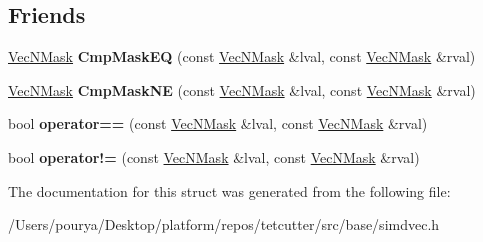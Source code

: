 \subsection*{Friends}
\begin{DoxyCompactItemize}
\item 
\hypertarget{structps_1_1simd_1_1VecNMask_a3b99811b675a188a3952056ffcecbfd8}{}\hyperlink{structps_1_1simd_1_1VecNMask}{Vec\+N\+Mask} {\bfseries Cmp\+Mask\+E\+Q} (const \hyperlink{structps_1_1simd_1_1VecNMask}{Vec\+N\+Mask} \&lval, const \hyperlink{structps_1_1simd_1_1VecNMask}{Vec\+N\+Mask} \&rval)\label{structps_1_1simd_1_1VecNMask_a3b99811b675a188a3952056ffcecbfd8}

\item 
\hypertarget{structps_1_1simd_1_1VecNMask_adc015c117f258c1e67929fe050eac18e}{}\hyperlink{structps_1_1simd_1_1VecNMask}{Vec\+N\+Mask} {\bfseries Cmp\+Mask\+N\+E} (const \hyperlink{structps_1_1simd_1_1VecNMask}{Vec\+N\+Mask} \&lval, const \hyperlink{structps_1_1simd_1_1VecNMask}{Vec\+N\+Mask} \&rval)\label{structps_1_1simd_1_1VecNMask_adc015c117f258c1e67929fe050eac18e}

\item 
\hypertarget{structps_1_1simd_1_1VecNMask_a3210aa60727a79d8450dcfd23dfe78d7}{}bool {\bfseries operator==} (const \hyperlink{structps_1_1simd_1_1VecNMask}{Vec\+N\+Mask} \&lval, const \hyperlink{structps_1_1simd_1_1VecNMask}{Vec\+N\+Mask} \&rval)\label{structps_1_1simd_1_1VecNMask_a3210aa60727a79d8450dcfd23dfe78d7}

\item 
\hypertarget{structps_1_1simd_1_1VecNMask_ada8276171f5dccbc61f5e1387aafd1f4}{}bool {\bfseries operator!=} (const \hyperlink{structps_1_1simd_1_1VecNMask}{Vec\+N\+Mask} \&lval, const \hyperlink{structps_1_1simd_1_1VecNMask}{Vec\+N\+Mask} \&rval)\label{structps_1_1simd_1_1VecNMask_ada8276171f5dccbc61f5e1387aafd1f4}

\end{DoxyCompactItemize}


The documentation for this struct was generated from the following file\+:\begin{DoxyCompactItemize}
\item 
/\+Users/pourya/\+Desktop/platform/repos/tetcutter/src/base/simdvec.\+h\end{DoxyCompactItemize}
